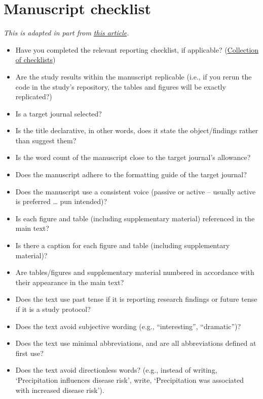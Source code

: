 \documentclass[
]{book}
\providecommand{\tightlist}{%
  \setlength{\itemsep}{0pt}\setlength{\parskip}{0pt}}
\begin{document}
\section{Manuscript checklist}\label{manuscript-checklist}

\emph{This is adapted in part from \href{https://www.nature.com/articles/d41586-019-01431-z}{this article}.}

\begin{itemize}
\tightlist
\item
  Have you completed the relevant reporting checklist, if applicable? (\href{https://www.equator-network.org/about-us/what-is-a-reporting-guideline/}{Collection of checklists})
\item
  Are the study results within the manuscript replicable (i.e., if you rerun the code in the study's repository, the tables and figures will be exactly replicated?)
\item
  Is a target journal selected?
\item
  Is the title declarative, in other words, does it state the object/findings rather than suggest them?
\item
  Is the word count of the manuscript close to the target journal's allowance?
\item
  Does the manuscript adhere to the formatting guide of the target journal?
\item
  Does the manuscript use a consistent voice (passive or active -- usually active is preferred \ldots{} pun intended)?
\item
  Is each figure and table (including supplementary material) referenced in the main text?
\item
  Is there a caption for each figure and table (including supplementary material)?
\item
  Are tables/figures and supplementary material numbered in accordance with their appearance in the main text?
\item
  Does the text use past tense if it is reporting research findings or future tense if it is a study protocol?
\item
  Does the text avoid subjective wording (e.g., ``interesting'', ``dramatic'')?
\item
  Does the text use minimal abbreviations, and are all abbreviations defined at first use?
\item
  Does the text avoid directionless words? (e.g., instead of writing, `Precipitation influences disease risk', write, `Precipitation was associated with increased disease risk').

\end{itemize}
\end{document}
